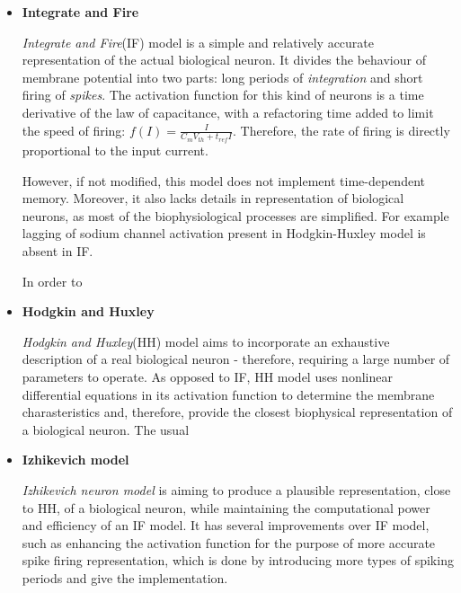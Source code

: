 \begin{itemize}

\item \textbf{Integrate and Fire}

\emph{Integrate and Fire}(IF) model is a simple and relatively accurate representation of the actual biological neuron.
It divides the behaviour of membrane potential into two parts: long periods of \emph{integration} and short firing of \emph{spikes}. The activation function for this kind of neurons is
a time derivative of the law of capacitance, with a refactoring time added to limit the speed of firing: \begin{math}f(I) = \frac{I}{C_{m}V_{th} + t_{ref}I}\end{math}.
Therefore, the rate of firing is directly proportional to the input current.\cite{WulframGerstner2002}

However, if not modified, this model does not implement time-dependent memory. Moreover, it also lacks details in representation of biological neurons, as most of the biophysiological 
processes are simplified. For example lagging of sodium channel activation present in Hodgkin-Huxley model is absent in IF.\cite{IFModel}

In order to 

\item \textbf{Hodgkin and Huxley}

\emph{Hodgkin and Huxley}(HH) model aims to incorporate an exhaustive description of a real biological neuron - therefore, requiring a large number of parameters to operate.
As opposed to IF, HH model uses nonlinear differential equations in its activation function to determine the membrane charasteristics and, therefore, provide the closest 
biophysical representation of a biological neuron.\cite{Hodgkin1952} The usual

\item \textbf{Izhikevich model}

\emph{Izhikevich neuron model} is aiming to produce a plausible representation, close to HH, of a biological neuron, while maintaining the computational power and efficiency of an IF model.
It has several improvements over IF model, such as enhancing the activation function for the purpose of more accurate spike firing representation, which is done by introducing more 
types of spiking periods and give the implementation.\cite{Izhikevich2003}

\end{itemize}

